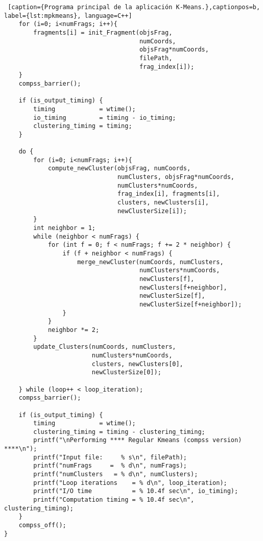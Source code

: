 \begin{lstlisting} [caption={Programa principal de la aplicación K-Means.},captionpos=b, 
label={lst:mpkmeans}, language=C++]
    for (i=0; i<numFrags; i++){
        fragments[i] = init_Fragment(objsFrag, 
									 numCoords,
									 objsFrag*numCoords,
									 filePath,
									 frag_index[i]);
    }
    compss_barrier();

    if (is_output_timing) {
        timing            = wtime();
        io_timing         = timing - io_timing;
        clustering_timing = timing;
    }

    do {
        for (i=0; i<numFrags; i++){
	    	compute_newCluster(objsFrag, numCoords, 
							   numClusters, objsFrag*numCoords,
							   numClusters*numCoords,
							   frag_index[i], fragments[i],
							   clusters, newClusters[i],
							   newClusterSize[i]);
        }
        int neighbor = 1;
        while (neighbor < numFrags) {
            for (int f = 0; f < numFrags; f += 2 * neighbor) {
                if (f + neighbor < numFrags) {
        			merge_newCluster(numCoords, numClusters, 
									 numClusters*numCoords, 
									 newClusters[f], 
									 newClusters[f+neighbor],
									 newClusterSize[f], 
									 newClusterSize[f+neighbor]);
                }
            }
            neighbor *= 2;
        }
        update_Clusters(numCoords, numClusters, 
						numClusters*numCoords,
						clusters, newClusters[0],
						newClusterSize[0]);

    } while (loop++ < loop_iteration);
    compss_barrier();

    if (is_output_timing) {
        timing            = wtime();
        clustering_timing = timing - clustering_timing;
        printf("\nPerforming **** Regular Kmeans (compss version) ****\n");
        printf("Input file:     % s\n", filePath);
        printf("numFrags     =  % d\n", numFrags);
        printf("numClusters   = % d\n", numClusters);
        printf("Loop iterations    = % d\n", loop_iteration);
        printf("I/O time           = % 10.4f sec\n", io_timing);
        printf("Computation timing = % 10.4f sec\n", clustering_timing);
    }
    compss_off();
}
\end{lstlisting}

